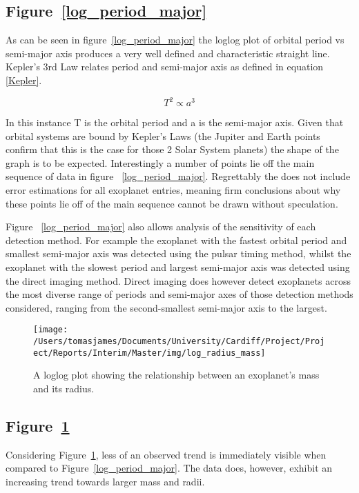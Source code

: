 \documentclass{article}
\begin{document}
\subsection*{Figure~\ref{log_period_major}}
As can be seen in figure~\ref{log_period_major} the loglog plot of orbital period vs semi-major axis produces a very well defined and characteristic straight line. Kepler's 3rd Law relates period and semi-major axis as defined in equation \ref{Kepler}.

\begin{equation} \label{Kepler}
    T^{2} \propto a^{3} 
\end{equation}

In this instance T is the orbital period and a is the semi-major axis. Given that orbital systems are bound by Kepler's Laws (the Jupiter and Earth points confirm that this is the case for those 2 Solar System planets) the shape of the graph is to be expected. Interestingly a number of points lie off the main sequence of data in figure ~\ref{log_period_major}. Regrettably the \autocite{exo} does not include error estimations for all exoplanet entries, meaning firm conclusions about why these points lie off of the main sequence cannot be drawn without speculation. 

Figure ~\ref{log_period_major} also allows analysis of the sensitivity of each detection method. For example the exoplanet with the fastest orbital period and smallest semi-major axis was detected using the pulsar timing method, whilst the exoplanet with the slowest period and largest semi-major axis was detected using the direct imaging method. Direct imaging does however detect exoplanets across the most diverse range of periods and semi-major axes of those detection methods considered, ranging from the second-smallest semi-major axis to the largest. 

\begin{figure}
\centering
    \texttt{[image: /Users/tomasjames/Documents/University/Cardiff/Project/Project/Reports/Interim/Master/img/log\_radius\_mass]}
\caption{A loglog plot showing the relationship between an exoplanet's mass and its radius.}\label{log_radius_mass}
\end{figure}

\subsection*{Figure~\ref{log_radius_mass}}
Considering Figure~\ref{log_radius_mass}, less of an observed trend is immediately visible when compared to Figure~\ref{log_period_major}. The data does, however, exhibit an increasing trend towards larger mass and radii.  
\end{document}
